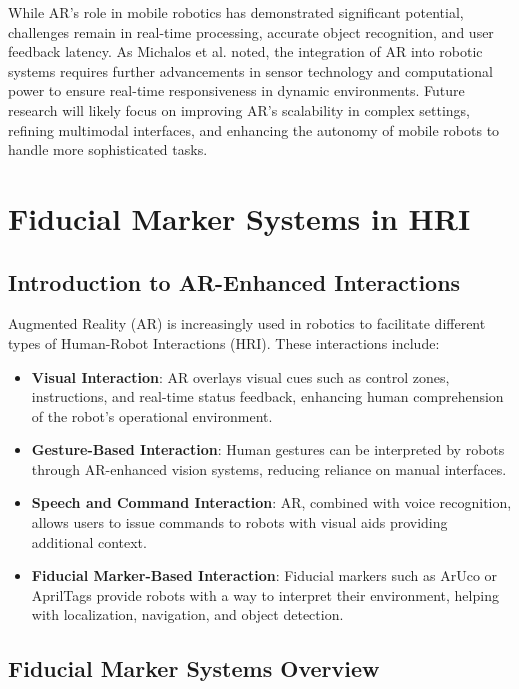 While AR’s role in mobile robotics has demonstrated significant potential, challenges remain in real-time processing, accurate object recognition, and user feedback latency. As Michalos et al. \cite{Michalos2022} noted, the integration of AR into robotic systems requires further advancements in sensor technology and computational power to ensure real-time responsiveness in dynamic environments. Future research will likely focus on improving AR’s scalability in complex settings, refining multimodal interfaces, and enhancing the autonomy of mobile robots to handle more sophisticated tasks.



\section{Fiducial Marker Systems in HRI}

\subsection{Introduction to AR-Enhanced Interactions}

Augmented Reality (AR) is increasingly used in robotics to facilitate different types of Human-Robot Interactions (HRI). These interactions include:

\begin{itemize}
    \item \textbf{Visual Interaction}: AR overlays visual cues such as control zones, instructions, and real-time status feedback, enhancing human comprehension of the robot's operational environment.
    \item \textbf{Gesture-Based Interaction}: Human gestures can be interpreted by robots through AR-enhanced vision systems, reducing reliance on manual interfaces.
    \item \textbf{Speech and Command Interaction}: AR, combined with voice recognition, allows users to issue commands to robots with visual aids providing additional context.
    \item \textbf{Fiducial Marker-Based Interaction}: Fiducial markers such as ArUco or AprilTags provide robots with a way to interpret their environment, helping with localization, navigation, and object detection.
\end{itemize}

\subsection{Fiducial Marker Systems Overview}

